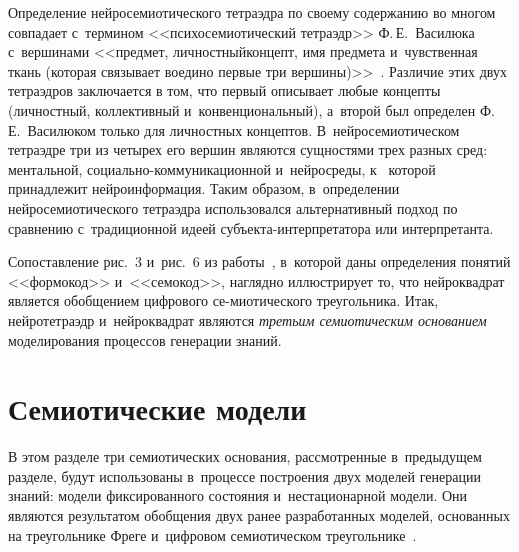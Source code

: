{\begin{multicols}{2}
      Определение нейросемиотического тетраэдра по своему содержанию во многом 
совпадает с~терми\-ном <<психосемиотический тетраэдр>> Ф.\,Е.~Ва\-силюка с~вершинами 
<<предмет, личностный\linebreak концепт, имя предмета и~чувственная ткань (которая
свя\-зы\-ва\-ет 
воедино первые три вершины)>>~\cite{21-zat}. Различие этих двух тетраэдров заключается 
в том, что первый описывает любые кон\-цеп\-ты (личностный, коллективный 
и~конвенциональный), а~второй был определен Ф.\,Е.~Василюком только для личностных 
концептов. В~нейросемиотическом тет\-ра\-эд\-ре три из четырех его вершин являются 
сущностями трех разных сред: ментальной, со\-ци\-аль\-но-ком\-му\-ни\-ка\-ци\-он\-ной и~нейросреды, к~
которой принадлежит нейроинформация. Таким образом, в~определении 
нейросемиотического тетраэдра использовался альтернативный подход по сравнению 
с~традиционной идеей субъ\-ек\-та-ин\-тер\-пре\-та\-то\-ра или интерпретанта.
      
      Сопоставление рис.~3 и~рис.~6 из работы~\cite{16-zat}, в~которой даны определения 
понятий <<формокод>> и~<<семокод>>, наглядно иллюстрирует то, что нейроквадрат 
является обобщением цифрового се-\linebreak миотического треугольника. Итак, нейротетраэдр 
и~нейро\-квадрат являются \textit{третьим семиотическим основанием} моделирования 
процессов генерации знаний.



\section{Семиотические модели}

      В этом разделе три семиотических основания, рассмотренные в~предыдущем 
разделе, будут использованы в~процессе построения двух моделей генерации знаний: 
модели фиксированного состояния и~нестационарной модели. Они являются результатом 
обобщения двух ранее разработанных моделей, основанных на треугольнике Фреге 
и~циф\-ро\-вом семиотическом треугольнике~\cite{16-zat, 22-zat}.
      

\end{multicols}}
